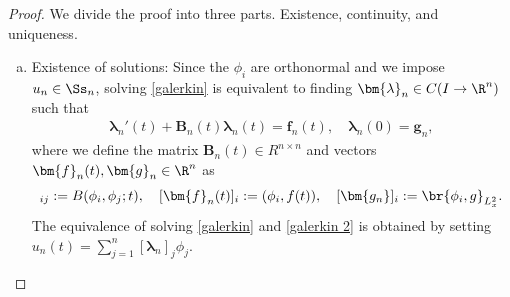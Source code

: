 \documentclass[
    a4paper,
    DIV=14,
    abstract=true,
    numbers=noenddot
]{scrartcl}
\begin{document}
\begin{proof}
 We divide the proof into three parts. Existence, continuity, and uniqueness.
  \begin{enumerate}[a)]
    \item Existence of solutions:  Since the $\phi_i$ are orthonormal and we impose $u_n \in \Ss _n$, solving \eqref{galerkin} is equivalent to finding $\bm{\lambda}_n\in C(I \to \R^n)$ such that
       \begin{align}\label{galerkin 2}
         \bm{\lambda}_n'(t) + \bm{B}_n(t) \bm{\lambda}_n(t) = \bm{f}_n(t), \quad \bm{\lambda}_n(0) = \bm{g}_n,
       \end{align}
 where we define the matrix $\bm{B}_n(t) \in R^{n \times n}$ and vectors $\bm{f}_n(t), \bm{g}_n \in \R^n$ as 
       \begin{align*}
 [\bm{B_n}(t)]_{ij}:= B(\phi_i, \phi_j;t), \quad [\bm{f}_n(t)]_i:= (\phi_i, f(t)), \quad [\bm{g_n}]_i:= \br{\phi_i,g}_{L_x^2}.
       \end{align*}
 The equivalence of solving \eqref{galerkin} and \eqref{galerkin 2} is obtained by setting $u_n(t) = \sum_{j=1}^n [\bm{\lambda}_n]_j \phi_j$.


\end{enumerate}
\end{proof}
\end{document}
